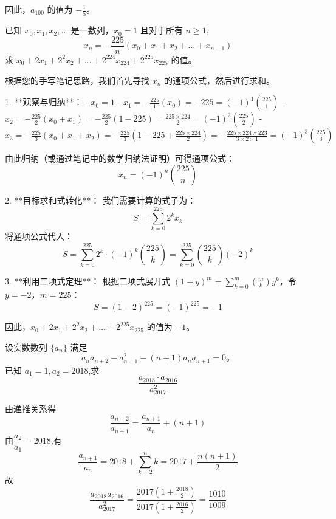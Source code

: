 \begin{questions}
\begin{solution}
因此，$a_{100}$ 的值为 $-\frac{1}{5}$。
\end{solution}

\question 已知 $x_0, x_1, x_2, \dots$ 是一数列，$x_0 = 1$ 且对于所有 $n \ge 1$,
\[ x_n = -\frac{225}{n}(x_0 + x_1 + x_2 + \dots + x_{n-1}) \]
求 $x_0 + 2x_1 + 2^2x_2 + \dots + 2^{224}x_{224} + 2^{225}x_{225}$ 的值。

\begin{solution}
根据您的手写笔记思路，我们首先寻找 $x_n$ 的通项公式，然后进行求和。

1. **观察与归纳**：
   - $x_0 = 1$
   - $x_1 = -\frac{225}{1}(x_0) = -225 = (-1)^1 \binom{225}{1}$
   - $x_2 = -\frac{225}{2}(x_0 + x_1) = -\frac{225}{2}(1 - 225) = \frac{225 \times 224}{2} = (-1)^2 \binom{225}{2}$
   - $x_3 = -\frac{225}{3}(x_0 + x_1 + x_2) = -\frac{225}{3}(1 - 225 + \frac{225 \times 224}{2}) = -\frac{225 \times 224 \times 223}{3 \times 2 \times 1} = (-1)^3 \binom{225}{3}$
   
   由此归纳（或通过笔记中的数学归纳法证明）可得通项公式：
   \[ x_n = (-1)^n \binom{225}{n} \]

2. **目标求和式转化**：
   我们需要计算的式子为：
   \[ S = \sum_{k=0}^{225} 2^k x_k \]
   将通项公式代入：
   \[ S = \sum_{k=0}^{225} 2^k \cdot (-1)^k \binom{225}{k} = \sum_{k=0}^{225} \binom{225}{k} (-2)^k \]

3. **利用二项式定理**：
   根据二项式展开式 $(1 + y)^m = \sum_{k=0}^{m} \binom{m}{k} y^k$，令 $y = -2$，$m = 225$：
   \[ S = (1 - 2)^{225} = (-1)^{225} = -1 \]

因此，$x_0 + 2x_1 + 2^2x_2 + \dots + 2^{225}x_{225}$ 的值为 $-1$。
\end{solution}

    \question 设实数数列 \(\{a_n\}\) 满足
    \[
    a_n a_{n+2} - a_{n+1}^2 - (n+1) a_n a_{n+1} = 0。
    \]
    已知 \(a_1 = 1, a_2 = 2018\),求
    \[
    \frac{a_{2018} \cdot a_{2016}}{a_{2017}^2}
    \]
    \begin{solution}
        由递推关系得
        \[
        \frac{a_{n+2}}{a_{n+1}} = \frac{a_{n+1}}{a_n} + (n+1)
        \]
        由$\dfrac{a_2}{a_1}=2018$,有
        \[
        \dfrac{a_{n+1}}{a_n} = 2018 + \sum_{k=2}^n k = 2017 + \frac{n(n+1)}{2}
        \]
        故
        \[
        \frac{a_{2018}a_{2016}}{a_{2017}^2} = 
        \frac{2017 \left(1 + \frac{2018}{2} \right)}{2017 \left(1 + \frac{2016}{2} \right)} = \dfrac{1010}{1009}
        \]
    \end{solution}


\end{questions}
